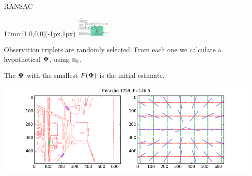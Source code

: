 \begin{frame}{RANSAC}
  \begin{textblock*}{17mm}[1.0,0.0](\paperwidth-1px,1px)
    \includegraphics[width=17mm]{blocos_s4.png}
  \end{textblock*}

  Observation triplets are randomly selected. From each one we calculate a hypothetical ${\boldsymbol{\Psi}}$, using ${\mathbf{n}}_k$.
  
  The ${\boldsymbol{\Psi}}$ with the smallest $F({\boldsymbol{\Psi}})$ is the initial estimate.
  \centerline{\includegraphics[height=8\baselineskip]{rdemo0014.png}}
  \hfill{}

\end{frame}


